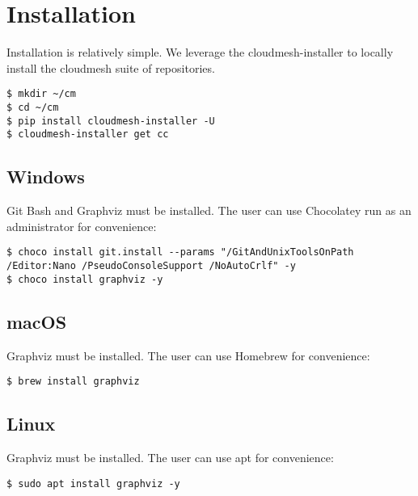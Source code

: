 \section{Installation}\label{installation}

Installation is relatively simple. We leverage the cloudmesh-installer
to locally install the cloudmesh suite of repositories.

\bigbreak
\begin{verbatim}
$ mkdir ~/cm
$ cd ~/cm
$ pip install cloudmesh-installer -U
$ cloudmesh-installer get cc
\end{verbatim}
\bigbreak

\subsection{Windows}\label{windows}

Git Bash and Graphviz must be installed. The user can use Chocolatey run
as an administrator for convenience:

\bigbreak
\begin{verbatim}
$ choco install git.install --params "/GitAndUnixToolsOnPath /Editor:Nano /PseudoConsoleSupport /NoAutoCrlf" -y
$ choco install graphviz -y
\end{verbatim}
\bigbreak

\subsection{macOS}\label{macos}

Graphviz must be installed. The user can use Homebrew for convenience:

\bigbreak
\begin{verbatim}
$ brew install graphviz
\end{verbatim}
\bigbreak

\hypertarget{linux}{%
\subsection{Linux}\label{linux}}

Graphviz must be installed. The user can use apt for convenience:

\bigbreak
\begin{verbatim}
$ sudo apt install graphviz -y
\end{verbatim}
\bigbreak
